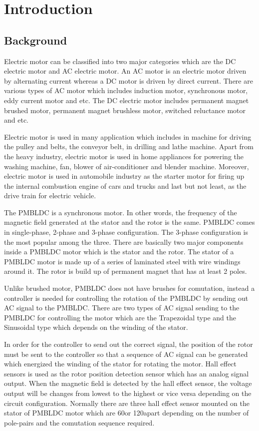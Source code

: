 \chapter{Introduction}\label{chap:intro}
\section{Background}

Electric motor can be classified into two major categories which are the DC electric motor and AC electric motor. An AC motor is an electric motor driven by alternating current whereas a DC motor is driven by direct current. There are various types of AC motor which includes induction motor, synchronous motor, eddy current motor and etc. The DC electric motor includes permanent magnet brushed motor, permanent magnet brushless motor, switched reluctance motor and etc.

Electric motor is used in many application which includes in machine for driving the pulley and belts, the conveyor belt, in drilling and lathe machine. Apart from the heavy industry, electric motor is used in home appliances for powering the washing machine, fan, blower of air-conditioner and blender machine. Moreover, electric motor is used in automobile industry as the starter motor for firing up the internal combustion engine of cars and trucks and last but not least, as the drive train for electric vehicle.

The PMBLDC is a synchronous motor. In other words, the frequency of the magnetic field generated at the stator and the rotor is the same. PMBLDC comes in single-phase, 2-phase and 3-phase configuration. The 3-phase configuration is the most popular among the three. There are basically two major components inside a PMBLDC motor which is the stator and the rotor. The stator of a PMBLDC motor is made up of 
a series of laminated steel with wire windings around it. The rotor is build up of permanent magnet that has at least 2 poles.

Unlike brushed motor, PMBLDC does not have brushes for comutation, instead a controller is needed for controlling the rotation of the PMBLDC by sending out AC signal to the PMBLDC. There are two types of AC signal sending to the PMBLDC for controlling the motor which are the Trapezoidal type and the Sinusoidal type which depends on the winding of the stator.

In order for the controller to send out the correct signal, the position of the rotor must be sent to the controller so that a sequence of AC signal can be generated which energized the winding of the stator for rotating the motor. Hall effect sensors is used as the rotor position detection sensor which has an analog signal output. When the magnetic field is detected by the hall effect sensor, the voltage output will be changes from lowest to the highest or vice versa depending on the circuit configuration. Normally there are three hall effect sensor mounted on the stator of PMBLDC motor which are 60\textdegree or 120\textdegree apart depending on the number of pole-pairs and the comutation sequence required.

